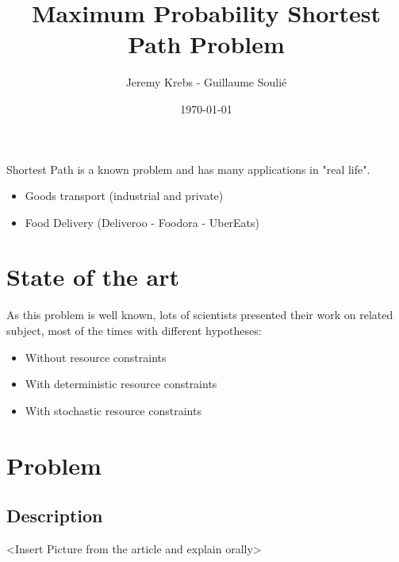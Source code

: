 \documentclass{beamer}
\title{Maximum Probability Shortest Path Problem}
\author{Jeremy Krebs - Guillaume Soulié}
\institute{Université Paris Saclay}
\date{\today}
\begin{document}
\begin{frame}
\titlepage
\end{frame}

\begin{frame}
  \tableofcontents
\end{frame}      

\begin{frame}
Shortest Path is a known problem and has many applications in "real life".

\begin{itemize}
	\item Goods transport (industrial and private)
	\item Food Delivery (Deliveroo - Foodora - UberEats)
\end{itemize}

\end{frame}

\section{State of the art}

\begin{frame}

As this problem is well known, lots of scientists presented their work on related subject, most of the times with different hypotheses:

\begin{itemize}
	\item<2-> Without resource constraints
	\item<3-> With deterministic resource constraints
	\item<4-> With stochastic resource constraints
\end{itemize}

\end{frame}

\section{Problem}
\subsection{Description}

\begin{frame}
	<Insert Picture from the article and explain orally>
\end{frame}
\end{document}
